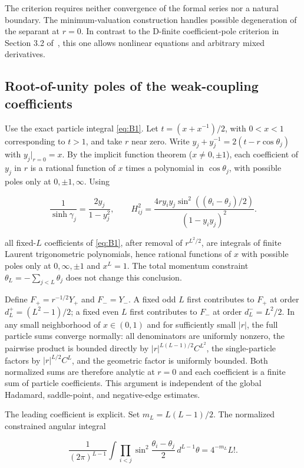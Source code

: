 \documentclass[11pt,a4paper]{article}
\numberwithin{equation}{section}
\theoremstyle{plain}
\theoremstyle{definition}
\begin{document}
The criterion requires neither convergence of the formal series nor a natural boundary. The minimum-valuation construction handles possible degeneration of the separant at \(r=0\). In contrast to the D-finite coefficient-pole criterion in Section 3.2 of~\cite{orrick}, this one allows nonlinear equations and arbitrary mixed derivatives.

\subsection{Root-of-unity poles of the weak-coupling coefficients}\label{sec:weak}

Use the exact particle integral \eqref{eq:B1}. Let \(t=(x+x^{-1})/2\), with \(0<x<1\) corresponding to \(t>1\), and take \(r\) near zero. Write \(y_j+y_j^{-1}=2(t-r\cos\theta_j)\) with \(y_j|_{r=0}=x\). By the implicit function theorem (\(x\ne0,\pm1\)), each coefficient of \(y_j\) in \(r\) is a rational function of \(x\) times a polynomial in \(\cos\theta_j\), with possible poles only at \(0,\pm1,\infty\). Using

\[\frac1{\sinh\gamma_j}=\frac{2y_j}{1-y_j^2},\qquad H_{ij}^2=\frac{4r y_i y_j\sin^2((\theta_i-\theta_j)/2)}{(1-y_i y_j)^2}.\]

all fixed-\(L\) coefficients of \eqref{eq:B1}, after removal of \(r^{L^2/2}\), are integrals of finite Laurent trigonometric polynomials, hence rational functions of \(x\) with possible poles only at \(0,\infty,\pm1\) and \(x^L=1\). The total momentum constraint \(\theta_L=-\sum_{j<L}\theta_j\) does not change this conclusion.

Define \(F_+=r^{-1/2}Y_+\) and \(F_-=Y_-\). A fixed odd \(L\) first contributes to \(F_+\) at order \(d_L^+=(L^2-1)/2\); a fixed even \(L\) first contributes to \(F_-\) at order \(d_L^-=L^2/2\). In any small neighborhood of \(x\in(0,1)\) and for sufficiently small \(|r|\), the full particle sums converge normally: all denominators are uniformly nonzero, the pairwise product is bounded directly by \(|r|^{L(L-1)/2}C^{L^2}\), the single-particle factors by \(|r|^{L/2}C^L\), and the geometric factor is uniformly bounded. Both normalized sums are therefore analytic at \(r=0\) and each coefficient is a finite sum of particle coefficients. This argument is independent of the global Hadamard, saddle-point, and negative-edge estimates.

The leading coefficient is explicit. Set \(m_L=L(L-1)/2\). The normalized constrained angular integral

\[\frac1{(2\pi)^{L-1}}\int\prod_{i<j}\sin^2\frac{\theta_i-\theta_j}{2}\,d^{L-1}\theta = 4^{-m_L}L!.\]
\end{document}
